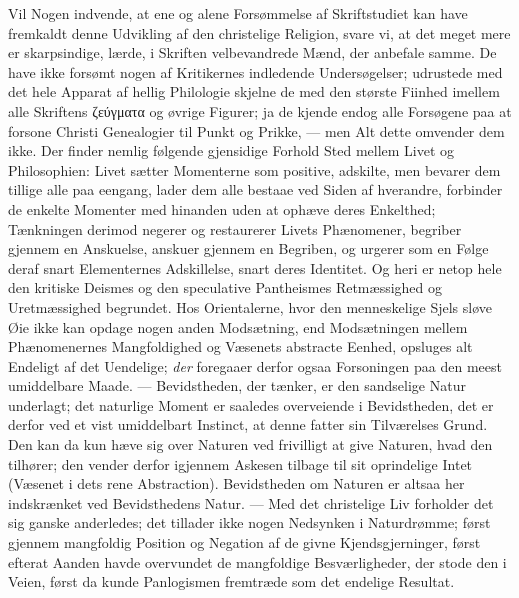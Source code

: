 \documentclass[12pt]{book}
\newcommand{\opage}[1]{\marginnote{\footnotesize\textit{[#1]}}}
\begin{document}
Vil Nogen indvende, at ene og alene Forsømmelse af Skriftstudiet kan have
fremkaldt denne Udvikling af den christelige Religion, svare vi, at det meget
mere er skarpsindige, lærde, i Skriften velbevandrede Mænd, der anbefale samme.
De have ikke forsømt nogen af Kritikernes indledende Undersøgelser; udrustede
med det hele Apparat af hellig Philologie skjelne de med den største Fiinhed
imellem alle Skriftens ζεύγματα og øvrige Figurer; ja de kjende endog alle
Forsøgene paa at forsone Christi Genealogier til Punkt og Prikke, --- men Alt
dette omvender dem ikke. Der finder nemlig følgende gjensidige Forhold Sted
mellem Livet og Philosophien: Livet sætter Momenterne som positive, adskilte,
men bevarer dem tillige alle paa eengang, lader dem alle bestaae ved Siden af
hverandre, forbinder de enkelte Momenter med hinanden uden at ophæve deres
Enkelthed; Tænkningen derimod negerer og restaurerer Livets Phænomener, begriber
gjennem en Anskuelse, anskuer gjennem en Begriben, og urgerer som en Følge deraf
snart Elementernes Adskillelse, snart deres Identitet. Og heri er netop hele den
kritiske Deismes og den speculative Pantheismes Retmæssighed og Uretmæssighed
begrundet.
\opage{136} Hos Orientalerne, hvor den menneskelige Sjels sløve Øie ikke kan opdage nogen
anden Modsætning, end Modsætningen mellem Phænomenernes Mangfoldighed og
Væsenets abstracte Eenhed, opsluges alt Endeligt af det Uendelige; \emph{der}
foregaaer derfor ogsaa Forsoningen paa den meest umiddelbare Maade. ---
Bevidstheden, der tænker, er den sandselige Natur underlagt; det naturlige
Moment er saaledes overveiende i Bevidstheden, det er derfor ved et vist
umiddelbart Instinct, at denne fatter sin Tilværelses Grund. Den kan da kun hæve
sig over Naturen ved frivilligt at give Naturen, hvad den tilhører; den vender
derfor igjennem Askesen tilbage til sit oprindelige Intet (Væsenet i dets rene
Abstraction). Bevidstheden om Naturen er altsaa her indskrænket ved
Bevidsthedens Natur. --- Med det christelige Liv forholder det sig ganske
anderledes; det tillader ikke nogen Nedsynken i Naturdrømme; først gjennem
mangfoldig Position og Negation af de givne Kjendsgjerninger, først efterat
Aanden havde overvundet de mangfoldige Besværligheder, der stode den i Veien,
først da kunde Panlogismen fremtræde som det endelige Resultat.
\end{document}

